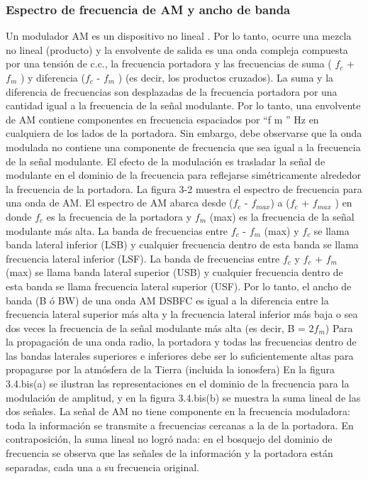\documentclass[a4paper,12pt,twoside]{article}
\begin{document}
\subsubsection{Espectro de frecuencia de AM y ancho de banda}
Un modulador AM es un dispositivo no lineal . Por lo tanto, ocurre una mezcla no lineal (producto) y la envolvente de salida es una onda compleja compuesta por una tensión de c.c., la frecuencia portadora y las frecuencias de suma ( $f_c$ + $f_m$ ) y diferencia ($f_c$ - $f_m$ ) (es decir, los productos cruzados).
 La suma y la diferencia de frecuencias son desplazadas de la frecuencia portadora por una cantidad igual a la frecuencia de la señal modulante.
Por lo tanto, una envolvente de AM contiene componentes en frecuencia espaciados por “f m ” Hz en cualquiera de los
lados de la portadora. Sin embargo, debe observarse que la onda modulada no contiene una componente de frecuencia
que sea igual a la frecuencia de la señal modulante. El efecto de la modulación es trasladar la señal de modulante en el
dominio de la frecuencia para reflejarse simétricamente alrededor la frecuencia de la portadora.
La figura 3-2 muestra el espectro de frecuencia para una onda de AM.
El espectro de AM abarca desde ($f_c$ - $f_{max}$) a ($f_c$ + $f_{max}$ ) en donde $f_c$ es la frecuencia de la portadora y $f_m$ (max) es la frecuencia de la señal modulante más alta. 
La banda de frecuencias entre $f_c$ - $f_m$ (max) y $f_c$ se llama banda lateral inferior (LSB) y cualquier frecuencia dentro de esta banda
se llama frecuencia lateral inferior (LSF). La banda de frecuencias entre $f_c$ y $f_c$ + $f_m$ (max) se llama banda lateral superior (USB) 
y cualquier frecuencia dentro de esta banda se llama frecuencia lateral superior (USF). 
Por lo tanto, el ancho de banda (B ó BW) de una onda AM DSBFC es igual a la diferencia entre la frecuencia lateral superior más alta
 y la frecuencia lateral inferior más baja o sea dos veces la frecuencia de la señal modulante más alta (es decir, B = $2f_m$)
Para la propagación de una onda radio, la portadora y todas las frecuencias dentro de las bandas laterales superiores e
inferiores debe ser lo suficientemente altas para propagarse por la atmósfera de la Tierra (incluida la ionosfera)
En la figura 3.4.bis(a) se ilustran las representaciones en el dominio de la frecuencia para la modulación de amplitud,
y en la figura 3.4.bis(b) se muestra la suma lineal de las dos señales. La señal de AM no tiene componente en la frecuencia
moduladora: toda la información se transmite a frecuencias cercanas a la de la portadora.
En contraposición, la suma lineal no logró nada: en el bosquejo del dominio de frecuencia se observa que las señales
de la información y la portadora están separadas, cada una a su frecuencia original.
\end{document}
